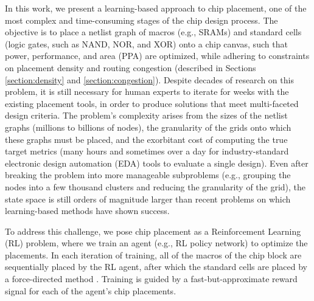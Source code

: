 \documentclass{article}
\begin{document}
In this work, we present a learning-based approach to chip placement, one of the most complex and time-consuming stages of the chip design process. The objective is to place a netlist graph of macros (e.g., SRAMs) and standard cells (logic gates, such as NAND, NOR, and XOR) onto a chip canvas, such that power, performance, and area (PPA) are optimized, while adhering to constraints on placement density and routing congestion (described in Sections \ref{section:density} and \ref{section:congestion}). Despite decades of research on this problem, it is still necessary for human experts to iterate for weeks with the existing placement tools, in order to produce solutions that meet multi-faceted design criteria. The problem's complexity arises from the sizes of the netlist graphs (millions to billions of nodes), the granularity of the grids onto which these graphs must be placed, and the exorbitant cost of computing the true target metrics (many hours and sometimes over a day for industry-standard electronic design automation (EDA) tools to evaluate a single design). Even after breaking the problem into more manageable subproblems (e.g., grouping the nodes into a few thousand clusters and reducing the granularity of the grid), the state space is still orders of magnitude larger than recent problems on which learning-based methods have shown success.

To address this challenge, we pose chip placement as a Reinforcement Learning (RL) problem, where we train an agent (e.g., RL policy network) to optimize the placements. In each iteration of training, all of the macros of the chip block are sequentially placed by the RL agent, after which the standard cells are placed by a force-directed method \cite{forcedirected1972, dplace2008,mfar2005,kraftwerk2005,kraftwerk22008,fastplace2007,rql2007}. Training is guided by a fast-but-approximate reward signal for each of the agent's chip placements. 

\end{document}
